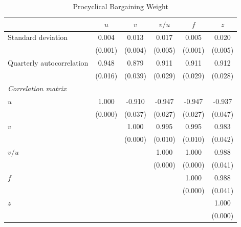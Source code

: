 \begin{table}[ht]
\centering
\caption{Procyclical Bargaining Weight}
\label{tab:proc_gamma}
\begin{tabular}{lccccc}
\toprule
 & $u$ & $v$ & $v/u$ & $f$ & $z$ \\
\midrule
Standard deviation & 0.004 & 0.013 & 0.017 & 0.005 & 0.020 \\
 & (0.001) & (0.004) & (0.005) & (0.001) & (0.005) \\
\addlinespace
Quarterly autocorrelation & 0.948 & 0.879 & 0.911 & 0.911 & 0.912 \\
 & (0.016) & (0.039) & (0.029) & (0.029) & (0.028) \\
\midrule
\multicolumn{6}{l}{\textit{Correlation matrix}} \\
\addlinespace
$u$ & 1.000 & -0.910 & -0.947 & -0.947 & -0.937 \\
 & (0.000) & (0.037) & (0.027) & (0.027) & (0.047) \\
\addlinespace
$v$ &  & 1.000 & 0.995 & 0.995 & 0.983 \\
 &  & (0.000) & (0.010) & (0.010) & (0.042) \\
\addlinespace
$v/u$ &  &  & 1.000 & 1.000 & 0.988 \\
 &  &  & (0.000) & (0.000) & (0.041) \\
\addlinespace
$f$ &  &  &  & 1.000 & 0.988 \\
 &  &  &  & (0.000) & (0.041) \\
\addlinespace
$z$ &  &  &  &  & 1.000 \\
 &  &  &  &  & (0.000) \\
\bottomrule
\end{tabular}
\end{table}
